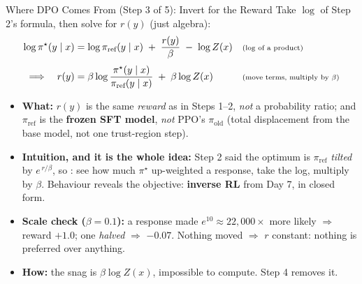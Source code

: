 \begin{frame}{Where DPO Comes From (Step 3 of 5): Invert for the Reward}
Take $\log$ of Step 2's formula, then solve for $r(y)$ (just algebra):
\begin{align*}
    \log\pi^\star(y\mid x)
        &= \log\pi_{\text{ref}}(y\mid x) \;+\; \frac{r(y)}{\beta} \;-\; \log Z(x)
        && \text{\scriptsize($\log$ of a product)}\\[0.3em]
    \Longrightarrow\quad
    r(y) &= \beta\log\frac{\pi^\star(y\mid x)}{\pi_{\text{ref}}(y\mid x)}
        \;+\; \beta\log Z(x)
        && \text{\scriptsize(move terms, multiply by $\beta$)}
\end{align*}
\begin{itemize}\itemsep0.15em\small
    \item \textbf{What:} $r(y)$ is the same \emph{reward} as in Steps 1--2, \emph{not}
          a probability ratio; and $\pi_{\text{ref}}$ is the \textbf{frozen SFT
          model}, \emph{not} PPO's $\pi_{\text{old}}$ (total displacement from the
          base model, not one trust-region step).
    \item \textbf{Intuition, and it is the whole idea:} Step 2 said the optimum is
          $\pi_{\text{ref}}$ \emph{tilted} by $e^{\,r/\beta}$, so : see how much $\pi^\star$ up-weighted a response, take the log,
          multiply by $\beta$. Behaviour reveals the objective: \textbf{inverse RL}
          from Day 7, in closed form.
    \item \textbf{Scale check ($\beta=0.1$):} a response made $e^{10}\!\approx\!
          22{,}000\times$ more likely $\Rightarrow$ reward $+1.0$; one \emph{halved}
          $\Rightarrow$ $-0.07$. Nothing moved $\Rightarrow$ $r$ constant: nothing is
          preferred over anything.
    \item \textbf{How:} the snag is $\beta\log Z(x)$, impossible to compute. Step 4
          removes it.
\end{itemize}
\end{frame}

